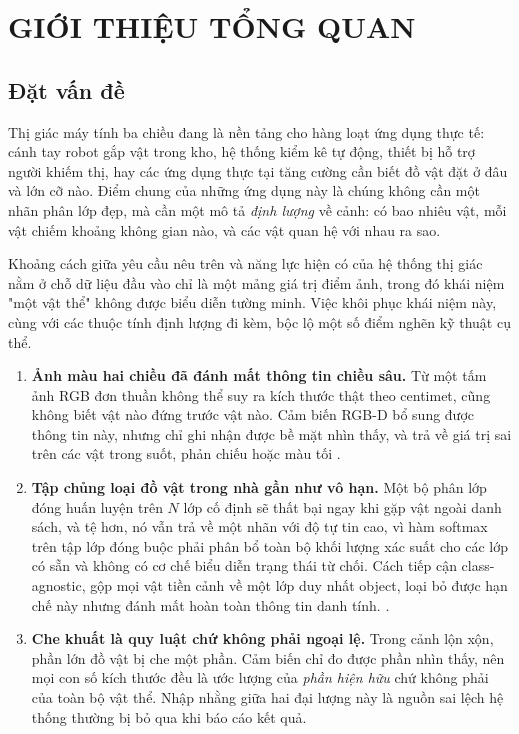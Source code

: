 \chapter{GIỚI THIỆU TỔNG QUAN}
\label{ch:gioi_thieu}

\section{Đặt vấn đề}

Thị giác máy tính ba chiều đang là nền tảng cho hàng loạt ứng dụng thực tế: cánh tay robot gắp
vật trong kho, hệ thống kiểm kê tự động, thiết bị hỗ trợ người khiếm thị, hay các ứng dụng thực
tại tăng cường cần biết đồ vật đặt ở đâu và lớn cỡ nào. Điểm chung của những ứng dụng này là
chúng không cần một nhãn phân lớp đẹp, mà cần một mô tả \emph{định lượng} về cảnh: có bao nhiêu
vật, mỗi vật chiếm khoảng không gian nào, và các vật quan hệ với nhau ra sao.

Khoảng cách giữa yêu cầu nêu trên và năng lực hiện có của hệ thống thị giác nằm ở chỗ dữ liệu đầu vào chỉ là một mảng giá trị điểm ảnh, trong đó khái niệm "một vật thể" không được biểu diễn tường minh. Việc khôi phục khái niệm này, cùng với các thuộc tính định lượng đi kèm, bộc lộ một số điểm nghẽn kỹ thuật cụ thể.

\begin{enumerate}[leftmargin=1.5cm] 
\item \textbf{Ảnh màu hai chiều đã đánh mất thông tin chiều sâu.} Từ một tấm ảnh RGB đơn thuần
không thể suy ra kích thước thật theo centimet, cũng không biết vật nào đứng trước vật nào. Cảm
biến RGB-D bổ sung được thông tin này, nhưng chỉ ghi nhận được bề mặt nhìn thấy, và trả về giá
trị sai trên các vật trong suốt, phản chiếu hoặc màu tối \cite{suchi2019ocid}.

\item \textbf{Tập chủng loại đồ vật trong nhà gần như vô hạn.} Một bộ phân lớp đóng huấn luyện
trên $N$ lớp cố định sẽ thất bại ngay khi gặp vật ngoài danh sách, và tệ hơn, nó vẫn trả về một nhãn với độ tự tin cao, vì hàm softmax trên tập lớp đóng buộc phải phân bổ toàn bộ khối lượng xác suất cho các lớp có sẵn và không có cơ chế biểu diễn trạng thái từ chối. Cách tiếp cận class-agnostic, gộp mọi vật tiền cảnh về một lớp duy nhất object, loại bỏ được hạn chế này nhưng đánh mất hoàn toàn thông tin danh tính. \cite{xie2021uois}.

\item \textbf{Che khuất là quy luật chứ không phải ngoại lệ.} Trong cảnh lộn xộn, phần lớn đồ
vật bị che một phần. Cảm biến chỉ đo được phần nhìn thấy, nên mọi con số kích thước đều là ước
lượng của \emph{phần hiện hữu} chứ không phải của toàn bộ vật thể. Nhập nhằng giữa hai đại lượng
này là nguồn sai lệch hệ thống thường bị bỏ qua khi báo cáo kết quả.
\end{enumerate}


